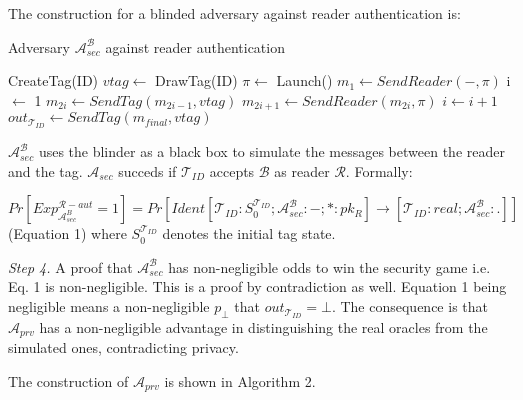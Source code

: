     The construction for a blinded adversary against reader authentication is:
    \begin{algorithm}[H] %
        \centering
        \caption{Adversary $\mathcal{A}_{sec}^{\mathcal{B}}$ against reader authentication}
        \begin{algorithmic}[1] %
            \State CreateTag(ID)
            \State $vtag \leftarrow$ DrawTag(ID)
            \State $\pi \leftarrow$ Launch() 
            \State $m_1 \leftarrow SendReader(-,\pi)$ 
            \State i $\leftarrow$ 1
                \State $m_{2i} \gets SendTag(m_{2i-1}, vtag)$ 
                \State $m_{2i+1} \gets SendReader(m_{2i}, \pi)$ 
                \State $i \gets i+1$
            \EndWhile
            \State $out_{\mathcal{T}_{ID}} \gets SendTag(m_{final}, vtag)$ 
        \end{algorithmic}
    \end{algorithm}

    $\mathcal{A}_{sec}^{\mathcal{B}}$ uses the blinder as a black box to simulate the messages between the reader and the tag.
    $\mathcal{A}_{sec}$ succeds if $\mathcal{T}_{ID}$ accepts $\mathcal{B}$ as reader $\mathcal{R}$. Formally:

    $Pr[Exp_{\mathcal{A}_{sec}^{B}}^{\mathcal{R}-aut} = 1] = Pr[Ident[\mathcal{T}_{ID}:S_0^{\mathcal{T}_{ID}}; \mathcal{A}_{sec}^{\mathcal{B}}:-; *:pk_{R}]
    \rightarrow [\mathcal{T}_{ID}:real; \mathcal{A}_{sec}^{\mathcal{B}}:.]]$ (Equation 1) where $S_0^{\mathcal{T}_{ID}}$ denotes the initial tag state.
    
    \textit{Step 4.} A proof that $\mathcal{A}_{sec}^{\mathcal{B}}$ has non-negligible odds to win the security game i.e. Eq. 1 is non-negligible.
    This is a proof by contradiction as well. Equation 1 being negligible means a non-negligible $p_{\bot}$ that $out_{\mathcal{T}_{ID}} = \bot$.
    The consequence is that $\mathcal{A}_{prv}$ has a non-negligible advantage in distinguishing the real oracles from the simulated ones, contradicting privacy.

    The construction of $\mathcal{A}_{prv}$ is shown in Algorithm 2.

